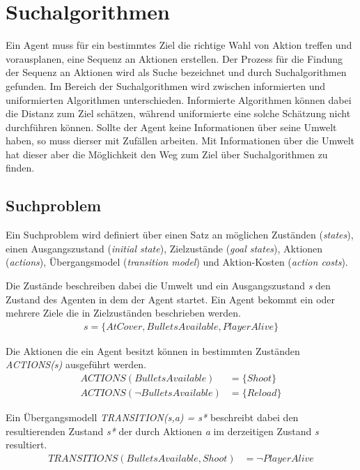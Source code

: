 \chapter{Suchalgorithmen}
Ein Agent muss für ein bestimmtes Ziel die richtige Wahl von Aktion treffen und vorausplanen, eine Sequenz an Aktionen erstellen. Der Prozess für die Findung der Sequenz an Aktionen wird als Suche bezeichnet und durch Suchalgorithmen gefunden. Im Bereich der Suchalgorithmen wird zwischen informierten und uniformierten Algorithmen unterschieden. Informierte Algorithmen können dabei die Distanz zum Ziel schätzen, während uniformierte eine solche Schätzung nicht durchführen können. Sollte der Agent keine Informationen über seine Umwelt haben, so muss dierser mit Zufällen arbeiten. Mit Informationen über die Umwelt hat dieser aber die Möglichkeit den Weg zum Ziel über Suchalgorithmen zu finden.

\section{Suchproblem}
Ein Suchproblem wird definiert über einen Satz an möglichen Zuständen (\textit{states}), einen Ausgangszustand (\textit{initial state}), Zielzustände (\textit{goal states}), Aktionen (\textit{actions}), Übergangsmodel (\textit{transition model}) und Aktion-Kosten (\textit{action costs}).

Die Zustände beschreiben dabei die Umwelt und ein Ausgangszustand \textit{s} den Zustand des Agenten in dem der Agent startet. Ein Agent bekommt ein oder mehrere Ziele die in Zielzuständen beschrieben werden.
\begin{align*}
s = \{AtCover, BulletsAvailable, PlayerAlive\}
\end{align*}

Die Aktionen die ein Agent besitzt können in bestimmten Zuständen \textit{ACTIONS(s)} ausgeführt werden.
\begin{align*}
ACTIONS(BulletsAvailable) &= \{Shoot\} \\
ACTIONS(\lnot BulletsAvailable) &= \{Reload\}
\end{align*}

Ein Übergangsmodell \textit{TRANSITION(s,a) = s*} beschreibt dabei den resultierenden Zustand \textit{s*} der durch Aktionen \textit{a} im derzeitigen Zustand \textit{s} resultiert.
\begin{align*}
TRANSITIONS(BulletsAvailable, Shoot) &= \lnot PlayerAlive
\end{align*}

